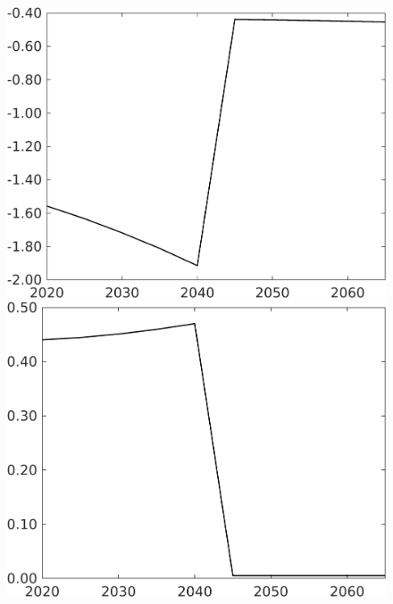 \begin{figure}[h!!!]
\begin{minipage}[]{0.32\textwidth}
	\end{minipage}
	\begin{minipage}[]{0.32\textwidth}
		\includegraphics[width=1\textwidth]{../../codding_model/own_basedOnFried/optimalPol_010922_revision/figures/all_13Sept22_Tplus30/gAf_OPT_COMPtaulPer_regime4_spillover0_knspil1_noskill1_sep0_xgrowth0_PV1_etaa0.79.png}
	\end{minipage}
	\begin{minipage}[]{0.32\textwidth}
		\includegraphics[width=1\textwidth]{../../codding_model/own_basedOnFried/optimalPol_010922_revision/figures/all_13Sept22_Tplus30/gAg_OPT_COMPtaulPer_regime4_spillover0_knspil1_noskill1_sep0_xgrowth0_PV1_etaa0.79.png}

\end{minipage}
\end{figure}
